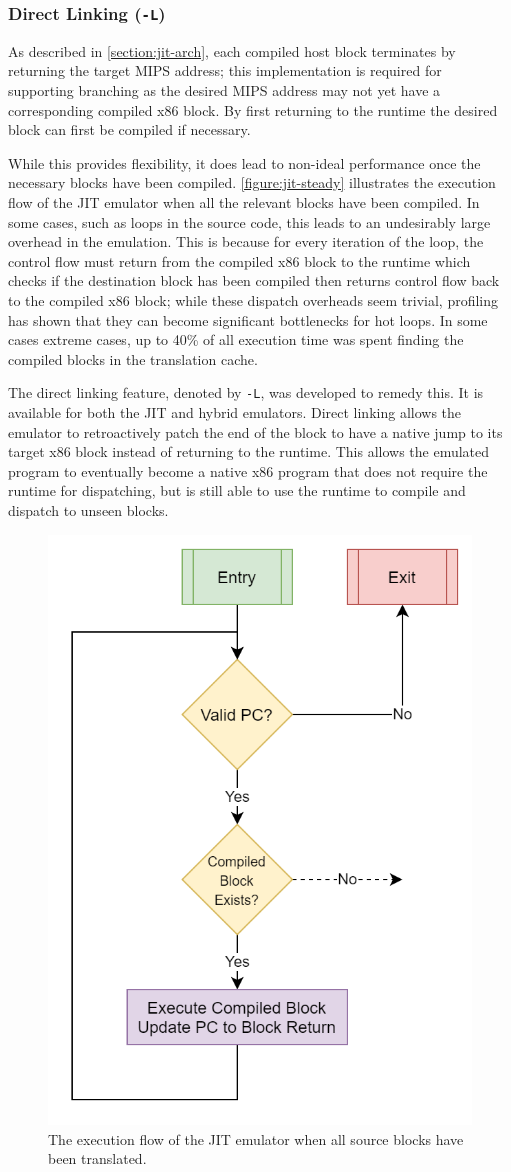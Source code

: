 \subsubsection{Direct Linking (\texttt{-L})}
\label{section:direct-linking}

As described in \autoref{section:jit-arch}, each compiled host block terminates by returning the target MIPS address; this implementation is required for supporting branching as the desired MIPS address may not yet have a corresponding compiled x86 block. By first returning to the runtime the desired block can first be compiled if necessary.

While this provides flexibility, it does lead to non-ideal performance once the necessary blocks have been compiled. \autoref{figure:jit-steady} illustrates the execution flow of the JIT emulator when all the relevant blocks have been compiled. In some cases, such as loops in the source code, this leads to an undesirably large overhead in the emulation. This is because for every iteration of the loop, the control flow must return from the compiled x86 block to the runtime which checks if the destination block has been compiled then returns control flow back to the compiled x86 block; while these dispatch overheads seem trivial, profiling has shown that they can become significant bottlenecks for hot loops. In some cases extreme cases, up to 40\% of all execution time was spent finding the compiled blocks in the translation cache.

The direct linking feature, denoted by \texttt{-L}, was developed to remedy this. It is available for both the JIT and hybrid emulators. Direct linking allows the emulator to retroactively patch the end of the block to have a native jump to its target x86 block instead of returning to the runtime. This allows the emulated program to eventually become a native x86 program that does not require the runtime for dispatching, but is still able to use the runtime to compile and dispatch to unseen blocks.

\begin{figure}[h]
    \centering
    \includegraphics[width=0.5\linewidth]{diagrams/jit-steady.png}
    \caption{The execution flow of the JIT emulator when all source blocks have been translated.}
    \label{figure:jit-steady}
\end{figure}

